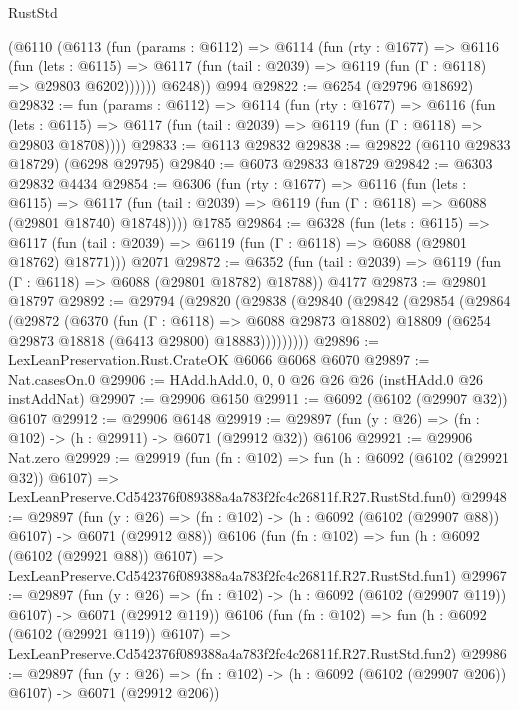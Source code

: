 \begin{lexlean}{RustStd}
\begin{coremodule}
      (@6110
        (@6113
          (fun (params : @6112) =>
          @6114
            (fun (rty : @1677) =>
            @6116
              (fun (lets : @6115) =>
              @6117 (fun (tail : @2039) => @6119 (fun (Γ : @6118) => @29803 @6202))))))
        @6248))
    @994
@29822 := @6254 (@29796 @18692)
@29832 := fun (params : @6112) =>
  @6114
    (fun (rty : @1677) =>
    @6116
      (fun (lets : @6115) =>
      @6117 (fun (tail : @2039) => @6119 (fun (Γ : @6118) => @29803 @18708))))
@29833 := @6113 @29832
@29838 := @29822 (@6110 @29833 @18729) (@6298 @29795)
@29840 := @6073 @29833 @18729
@29842 := @6303 @29832 @4434
@29854 := @6306
    (fun (rty : @1677) =>
    @6116
      (fun (lets : @6115) =>
      @6117 (fun (tail : @2039) => @6119 (fun (Γ : @6118) => @6088 (@29801 @18740) @18748))))
    @1785
@29864 := @6328
    (fun (lets : @6115) =>
    @6117 (fun (tail : @2039) => @6119 (fun (Γ : @6118) => @6088 (@29801 @18762) @18771)))
    @2071
@29872 := @6352
    (fun (tail : @2039) => @6119 (fun (Γ : @6118) => @6088 (@29801 @18782) @18788))
    @4177
@29873 := @29801 @18797
@29892 := @29794
    (@29820
      (@29838
        (@29840
          (@29842
            (@29854
              (@29864
                (@29872
                  (@6370
                    (fun (Γ : @6118) => @6088 @29873 @18802)
                    @18809
                    (@6254 @29873 @18818 (@6413 @29800) @18883)))))))))
@29896 := LexLeanPreservation.Rust.CrateOK @6066 @6068 @6070
@29897 := Nat.casesOn.{0}
@29906 := HAdd.hAdd.{0, 0, 0} @26 @26 @26 (instHAdd.{0} @26 instAddNat)
@29907 := @29906 @6150
@29911 := @6092 (@6102 (@29907 @32)) @6107
@29912 := @29906 @6148
@29919 := @29897 (fun (y : @26) => (fn : @102) -> (h : @29911) -> @6071 (@29912 @32)) @6106
@29921 := @29906 Nat.zero
@29929 := @29919
    (fun (fn : @102) =>
    fun (h : @6092 (@6102 (@29921 @32)) @6107) =>
    LexLeanPreserve.Cd542376f089388a4a783f2fc4c26811f.R27.RustStd.fun0)
@29948 := @29897
    (fun (y : @26) => (fn : @102) -> (h : @6092 (@6102 (@29907 @88)) @6107) -> @6071 (@29912 @88))
    @6106
    (fun (fn : @102) =>
    fun (h : @6092 (@6102 (@29921 @88)) @6107) =>
    LexLeanPreserve.Cd542376f089388a4a783f2fc4c26811f.R27.RustStd.fun1)
@29967 := @29897
    (fun (y : @26) => (fn : @102) -> (h : @6092 (@6102 (@29907 @119)) @6107) -> @6071 (@29912 @119))
    @6106
    (fun (fn : @102) =>
    fun (h : @6092 (@6102 (@29921 @119)) @6107) =>
    LexLeanPreserve.Cd542376f089388a4a783f2fc4c26811f.R27.RustStd.fun2)
@29986 := @29897
    (fun (y : @26) => (fn : @102) -> (h : @6092 (@6102 (@29907 @206)) @6107) -> @6071 (@29912 @206))

\end{coremodule}
\end{lexlean}
